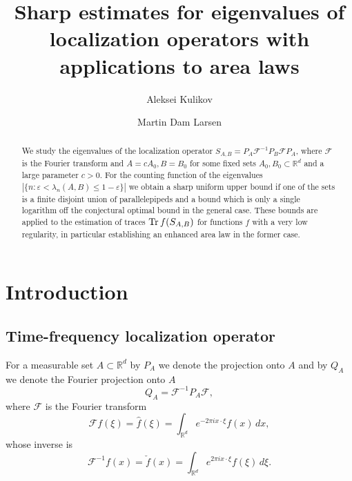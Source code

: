 \documentclass[12pt]{amsart}
\title{Sharp estimates for eigenvalues of localization operators with applications to area laws}
\numberwithin{equation}{section}
\newcommand{\R}{\mathbb{R}}
\newcommand{\F}{\mathcal{F}}
\begin{document}
\sloppy


\author{Aleksei Kulikov}
\address{Aleksei Kulikov,
\newline University of Copenhagen, Department of Mathematical Sciences,
Universitetsparken 5, 2100 Copenhagen, Denmark,
}

\author{Martin Dam Larsen}
\address{Martin Dam Larsen,
\newline University of Copenhagen, Department of Mathematical Sciences,
Universitetsparken 5, 2100 Copenhagen, Denmark,
}


\begin{abstract} 
We study the eigenvalues of the localization operator $S_{A, B} = P_A\mathcal{F}^{-1}P_B\mathcal{F} P_A$, where $\mathcal{F}$ is the Fourier transform and $A = cA_0, B = B_0$ for some fixed sets $A_0, B_0\subset \mathbb{R}^d$ and a large parameter $c > 0$. For the counting function of the eigenvalues $|\{n: \varepsilon < \lambda_n(A,B)\le 1-\varepsilon\}|$ we obtain  a sharp uniform upper bound if one of the sets is a finite disjoint union of parallelepipeds and a bound which is only a single logarithm off the conjectural optimal bound in the general case. These bounds are applied to the estimation of traces ${\rm{Tr}}\, f(S_{A,B})$ for functions $f$ with a very low regularity, in particular establishing an enhanced area law in the former case.
\end{abstract}

\maketitle
\pagestyle{plain}
\section{Introduction}
\subsection{Time-frequency localization operator}
For a measurable set $A\subset\R^d$ by $P_A$ we denote the projection onto $A$ and by $Q_A$ we denote the Fourier projection onto $A$
\[
Q_A = \F^{-1}P_A\F,
\]
where $\F$ is the Fourier transform
\[
\mathcal{F}f(\xi) = \hat{f}(\xi) = \int_{\R^d} e^{-2\pi i x\cdot \xi} f(x) \, dx,
\]
whose inverse is
$$\F^{-1}f(x) = \check{f}(x) =\int_{\R^d} e^{2\pi i x\cdot \xi}f(\xi)\, d\xi.$$
\end{document}
